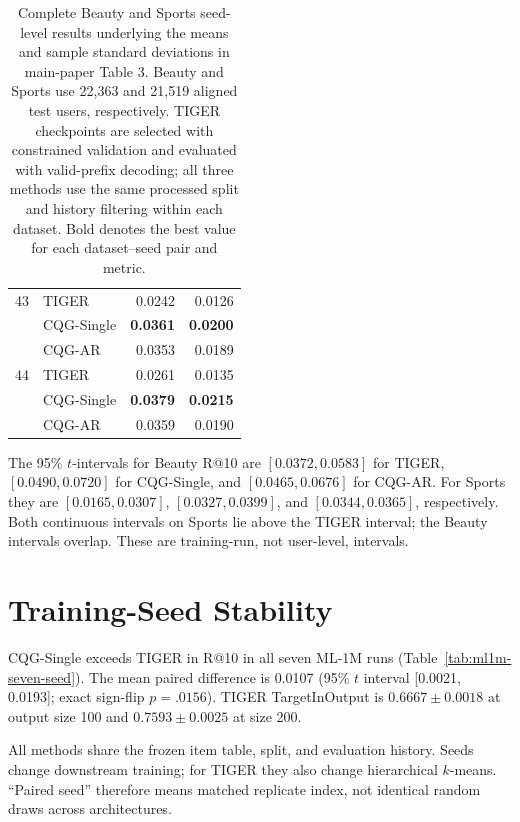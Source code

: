 \documentclass[letterpaper]{article}
\begin{document}
\begin{table}[H]
\begin{minipage}[t]{0.48\textwidth}
\begin{tabular}{llrr}
43 & TIGER & 0.0242 & 0.0126 \\
 & CQG-Single & \textbf{0.0361} & \textbf{0.0200} \\
 & CQG-AR & 0.0353 & 0.0189 \\
44 & TIGER & 0.0261 & 0.0135 \\
 & CQG-Single & \textbf{0.0379} & \textbf{0.0215} \\
 & CQG-AR & 0.0359 & 0.0190 \\
\bottomrule
\end{tabular}
\end{minipage}
\caption{Complete Beauty and Sports seed-level results underlying the means
and sample standard deviations in main-paper Table 3. Beauty and Sports use
22,363 and 21,519 aligned test users, respectively. TIGER checkpoints are
selected with constrained validation and evaluated with valid-prefix
decoding; all three methods use the same processed split and history
filtering within each dataset. Bold denotes the best value for each
dataset--seed pair and metric.}
\label{tab:auto-tiger-results}
\end{table}

The 95\% \(t\)-intervals for Beauty R@10 are
\([0.0372,0.0583]\) for TIGER, \([0.0490,0.0720]\) for CQG-Single, and
\([0.0465,0.0676]\) for CQG-AR. For Sports they are
\([0.0165,0.0307]\), \([0.0327,0.0399]\), and
\([0.0344,0.0365]\), respectively. Both continuous intervals on Sports lie
above the TIGER interval; the Beauty intervals overlap. These are
training-run, not user-level, intervals.

\section{Training-Seed Stability}
\label{app:seed-stability}

CQG-Single exceeds TIGER in R@10 in all seven ML-1M runs
(Table~\ref{tab:ml1m-seven-seed}). The mean paired difference is 0.0107
(95\% $t$ interval [0.0021, 0.0193]; exact sign-flip $p=.0156$).
TIGER TargetInOutput is \(0.6667\pm0.0018\) at output size 100 and
\(0.7593\pm0.0025\) at size 200.

All methods share the frozen item table, split, and evaluation history.
Seeds change downstream training; for TIGER they also change hierarchical
$k$-means. ``Paired seed'' therefore means matched replicate index, not
identical random draws across architectures.
\end{document}
